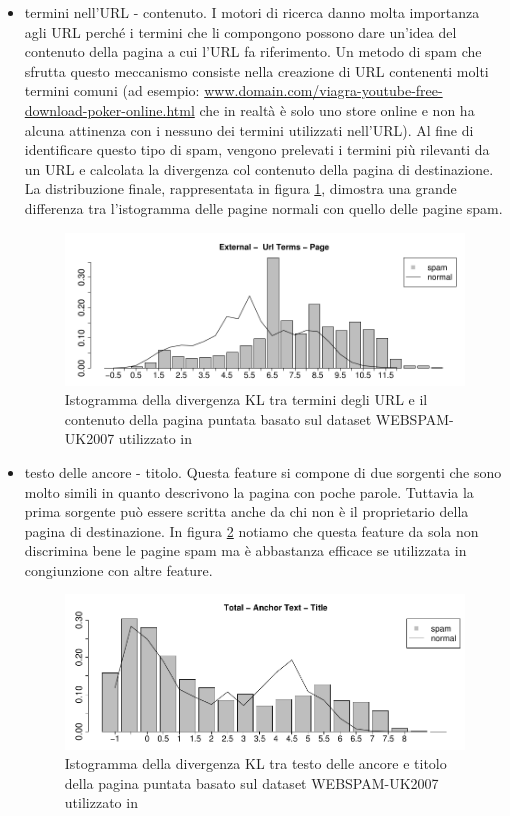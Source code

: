 \begin{itemize}
\item termini nell'URL - contenuto. I motori di ricerca danno molta importanza agli URL perché i termini che  li compongono  possono dare un'idea del contenuto della pagina a cui l'URL fa riferimento.  Un metodo di spam che sfrutta questo meccanismo consiste nella creazione di URL contenenti molti termini comuni (ad esempio: \url{www.domain.com/viagra-youtube-free-download-poker-online.html} che in realtà è solo uno store online e non ha alcuna attinenza con i nessuno dei termini utilizzati nell'URL). Al fine di identificare questo tipo di spam, vengono prelevati i termini più rilevanti da un URL e calcolata la divergenza col contenuto della pagina di destinazione. La distribuzione finale, rappresentata in figura \ref{fig:martinez3}, dimostra una grande differenza tra l'istogramma delle pagine normali con quello delle pagine spam.
\begin{figure}[htbp]
\centering
\includegraphics[width=12cm]{immagini/martinez/martinez3}
\caption{Istogramma della divergenza KL tra termini degli URL e il contenuto della pagina puntata basato sul dataset WEBSPAM-UK2007 utilizzato in \cite{Martinez-Romo:2009:WSI:1531914.1531920}}
\label{fig:martinez3}
\end{figure}

\item testo delle ancore - titolo. Questa feature si compone di due sorgenti che sono molto simili in quanto descrivono la pagina con poche parole. Tuttavia la prima sorgente può essere scritta anche da chi non è il proprietario della pagina di destinazione.  In figura \ref{fig:martinez4} notiamo che questa feature da sola non discrimina bene le pagine spam ma è abbastanza efficace se utilizzata in congiunzione con altre feature.
\begin{figure}[htbp]
\centering
\includegraphics[width=12cm]{immagini/martinez/martinez4}
\caption{Istogramma della divergenza KL tra testo delle ancore e titolo della pagina puntata basato sul dataset WEBSPAM-UK2007 utilizzato in \cite{Martinez-Romo:2009:WSI:1531914.1531920}}
\label{fig:martinez4}
\end{figure}


\end{itemize}
